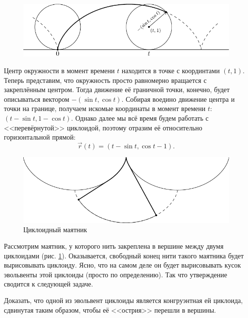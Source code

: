 \begin{figure}[H]
	\centering
	\includegraphics[width=12cm]{./img/CycloidEquation.pdf}
	\caption[format=empty]{}
\end{figure}

Центр окружности в момент времени $t$ находится в точке с координтами $(t, 1)$. Теперь представим, что окружность просто равномерно вращается с закреплённым центром. Тогда движение её граничной точки, конечно, будет описываться вектором $-(\sin t, \cos t)$. Собирая воедино движение центра и точки на границе, получаем искомые координаты в момент времени $t$: $(t - \sin t, 1 - \cos t)$. Однако далее мы всё время будем работать с <<перевёрнутой>> циклоидой, поэтому отразим её относительно горизонтальной прямой:
\[
	\vec{r}(t) = (t - \sin t, \cos t - 1).
\]

\begin{figure}[H]
	\centering
	\includegraphics[width=12cm]{./img/Pendulum.pdf}
	\caption{Циклоидный маятник}
	\label{fig:Pendulum}
\end{figure}

Рассмотрим маятник, у которого нить закреплена в вершине между двумя циклоидами (рис. \ref{fig:Pendulum}). Оказывается, свободный конец нити такого маятника будет вырисовывать циклоиду. Ясно, что на самом деле он будет вырисовывать кусок эвольвенты этой циклоиды (просто по определению). Так что утверждение сводится к следующей задаче.

\begin{problem}
	Доказать, что одной из эвольвент циклоиды является конгруэнтная ей циклоида, сдвинутая таким образом, чтобы её <<острия>> перешли в вершины.
\end{problem}

